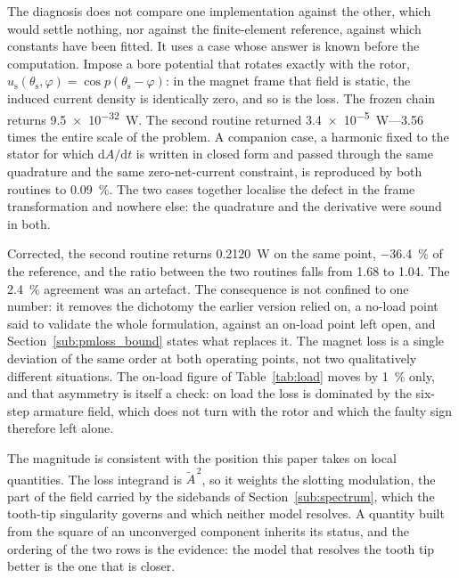 \documentclass[10pt,a4paper,twocolumn]{article}
\theoremstyle{plain}
\theoremstyle{remark}
\begin{document}
The diagnosis does not compare one implementation against the other,
which would settle nothing, nor against the finite-element reference,
against which constants have been fitted. It uses a case whose answer is
known before the computation. Impose a bore potential that rotates
exactly with the rotor,
$u_{\mathrm{s}}(\theta_{\mathrm{s}},\varphi)=\cos p(\theta_{\mathrm{s}}
-\varphi)$: in the magnet frame that field is static, the induced
current density is identically zero, and so is the loss. The frozen
chain returns \SI{9.5e-32}{\watt}. The second routine returned
\SI{3.4e-5}{\watt}---\num{3.56} times the entire scale of the problem.
A companion case, a harmonic fixed to the stator for which
$\mathrm{d}A/\mathrm{d}t$ is written in closed form and passed through
the same quadrature and the same zero-net-current constraint, is
reproduced by both routines to \SI{0.09}{\percent}. The two cases
together localise the defect in the frame transformation and nowhere
else: the quadrature and the derivative were sound in both.

Corrected, the second routine returns \SI{0.2120}{\watt} on the same
point, \SI{-36.4}{\percent} of the reference, and the ratio between the
two routines falls from \num{1.68} to \num{1.04}. The
\SI{2.4}{\percent} agreement was an artefact. The consequence is not
confined to one number: it removes the dichotomy the earlier version
relied on, a no-load point said to validate the whole formulation,
against an on-load point left open, and Section~\ref{sub:pmloss_bound}
states what replaces it. The magnet loss is a single deviation of the
same order at both operating points, not two qualitatively different
situations. The on-load figure of Table~\ref{tab:load} moves by
\SI{1}{\percent} only, and that asymmetry is itself a check: on load the
loss is dominated by the six-step armature field, which does not turn
with the rotor and which the faulty sign therefore left alone.

The magnitude is consistent with the position this paper takes on local
quantities. The loss integrand is $\widetilde{A}^{\,2}$, so it weights
the slotting modulation, the part of the field carried by the sidebands
of Section~\ref{sub:spectrum}, which the tooth-tip singularity governs
and which neither model resolves. A quantity built from the square of an
unconverged component inherits its status, and the ordering of the two
rows is the evidence: the model that resolves the tooth tip better is
the one that is closer.
\end{document}
